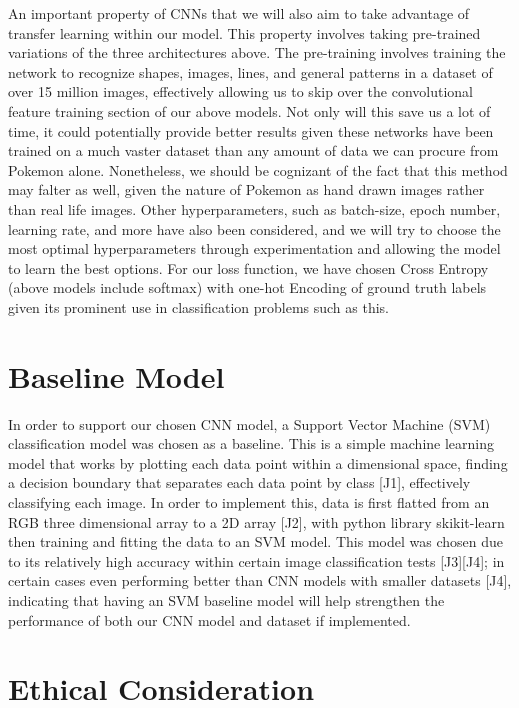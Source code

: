 \documentclass{article} %
\begin{document}
An important property of CNNs that we will also aim to take advantage of transfer learning within our model. This property involves taking pre-trained variations of the three architectures above. The pre-training involves training the network to recognize shapes, images, lines, and general patterns in a dataset of over 15 million images, effectively allowing us to skip over the convolutional feature training section of our above models. Not only will this save us a lot of time, it could potentially provide better results given these networks have been trained on a much vaster dataset than any amount of data we can procure from Pokemon alone. Nonetheless, we should be cognizant of the fact that this method may falter as well, given the nature of Pokemon as hand drawn images rather than real life images. Other hyperparameters, such as batch-size, epoch number, learning rate, and more have also been considered, and we will try to choose the most optimal hyperparameters through experimentation and allowing the model to learn the best options. For our loss function, we have chosen Cross Entropy (above models include softmax) with one-hot Encoding of ground truth labels given its prominent use in classification problems such as this.

\section {Baseline Model}

In order to support our chosen CNN model, a Support Vector Machine (SVM) classification model was chosen as a baseline. This is a simple machine learning model that works by plotting each data point within a dimensional space, finding a decision boundary that separates each data point by class [J1], effectively classifying each image. In order to implement this, data is first flatted from an RGB three dimensional array to a 2D array [J2], with python library skikit-learn then training and fitting the data to an SVM model. This model was chosen due to its relatively high accuracy within certain image classification tests [J3][J4]; in certain cases even performing better than CNN models with smaller datasets [J4], indicating that having an SVM baseline model will help strengthen the performance of both our CNN model and dataset if implemented.

\section {Ethical Consideration}
\end{document}
